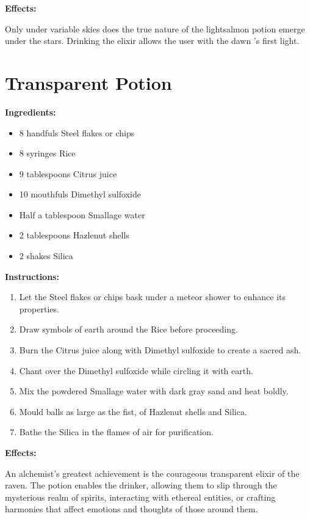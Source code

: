 \documentclass{article}
\begin{document}
\textbf{Effects:}

Only under variable skies does the true nature of the lightsalmon potion emerge under the stars. Drinking the elixir allows the user with the dawn 's first light.

\newpage
\section*{Transparent Potion}

\textbf{Ingredients:}

\begin{itemize}
  \item 8 handfuls Steel flakes or chips
  \item 8 syringes Rice
  \item 9 tablespoons Citrus juice
  \item 10 mouthfuls Dimethyl sulfoxide
  \item Half a tablespoon Smallage water
  \item 2 tablespoons Hazlenut shells
  \item 2 shakes Silica
\end{itemize}

\textbf{Instructions:}

\begin{enumerate}
  \item Let the Steel flakes or chips bask under a meteor shower to enhance its properties.
  \item Draw symbols of earth around the Rice before proceeding.
  \item Burn the Citrus juice along with Dimethyl sulfoxide to create a sacred ash.
  \item Chant over the Dimethyl sulfoxide while circling it with earth.
  \item Mix the powdered Smallage water with dark gray sand and heat boldly.
  \item Mould balls as large as the fist, of Hazlenut shells and Silica.
  \item Bathe the Silica in the flames of air for purification.
\end{enumerate}

\textbf{Effects:}

An alchemist's greatest achievement is the courageous transparent elixir of the raven. The potion enables the drinker, allowing them to slip through the mysterious realm of spirits, interacting with ethereal entities, or crafting harmonies that affect emotions and thoughts of those around them.
\end{document}
